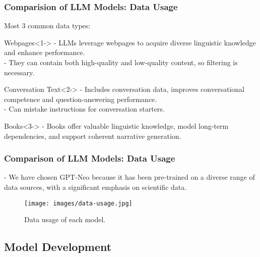 \documentclass[10pt]{beamer}
\begin{document}
\begin{frame}
\frametitle{Comparision of LLM Models: Data Usage}
Most 3 common data types:

\begin{block}{Webpages}<1->
- LLMs leverage webpages to acquire diverse linguistic knowledge and enhance performance.\\
- They can contain both high-quality and low-quality content, so filtering is necessary.
\end{block}

\begin{block}{Conversation Text}<2->
- Includes conversation data, improves conversational competence and question-answering performance.\\
- Can mistake instructions for conversation starters.
\end{block}

\begin{block}{Books}<3->
- Books offer valuable linguistic knowledge, model long-term dependencies, and support coherent narrative generation.\\
\end{block}
\end{frame}



\begin{frame}
\frametitle{Comparison of LLM Models: Data Usage}
- We have chosen \alert{GPT-Neo} because it has been pre-trained on a diverse range of data sources, with a significant emphasis on scientific data.
\begin{figure}
\texttt{[image: images/data-usage.jpg]}
\caption{Data usage of each model.}
\end{figure}
\end{frame}



\subsection{Model Development} %
\end{document}
